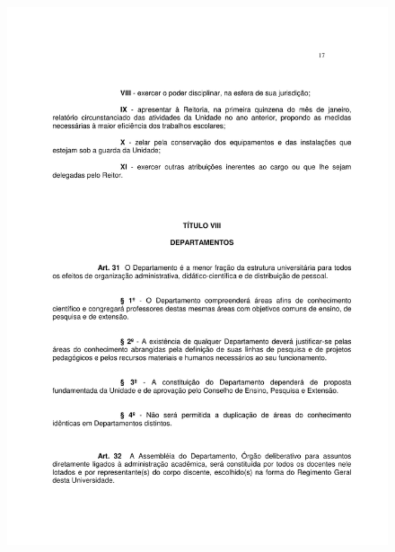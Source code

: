 \begin{figure}[p]
	\centering 
	\includegraphics[scale=0.7]{capitulos/resolucoes/cuni414/cuni414-17.pdf}
\end{figure}

